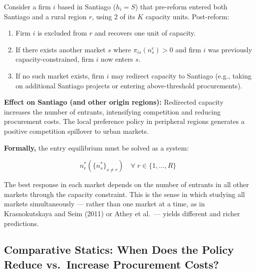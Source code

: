 \documentclass[10pt]{article}
\begin{document}
Consider a firm $i$ based in Santiago ($h_i = S$) that pre-reform entered both Santiago and a rural region $r$, using 2 of its $K$ capacity units. Post-reform:

\begin{enumerate}
  \item Firm $i$ is excluded from $r$ and recovers one unit of capacity.
  \item If there exists another market $s$ where $\pi_{is}(n_s^e) > 0$ and firm $i$ was previously capacity-constrained, firm $i$ now enters $s$.
  \item If no such market exists, firm $i$ may redirect capacity to Santiago (e.g., taking on additional Santiago projects or entering above-threshold procurements).
\end{enumerate}

\noindent\textbf{Effect on Santiago (and other origin regions):} Redirected capacity increases the number of entrants, intensifying competition and reducing procurement costs. The local preference policy in peripheral regions generates a positive competition spillover to urban markets.

\medskip
\noindent\textbf{Formally,} the entry equilibrium must be solved as a system:

\[
  n_r^*\!\left(\{n_s^*\}_{s \neq r}\right) \quad \forall\; r \in \{1, \dots, R\}
\]

The best response in each market depends on the number of entrants in all other markets through the capacity constraint. This is the sense in which studying all markets simultaneously --- rather than one market at a time, as in Krasnokutskaya and Seim (2011) or Athey et al.\ --- yields different and richer predictions.

\subsection{Comparative Statics: When Does the Policy Reduce vs.\ Increase Procurement Costs?}
\end{document}
